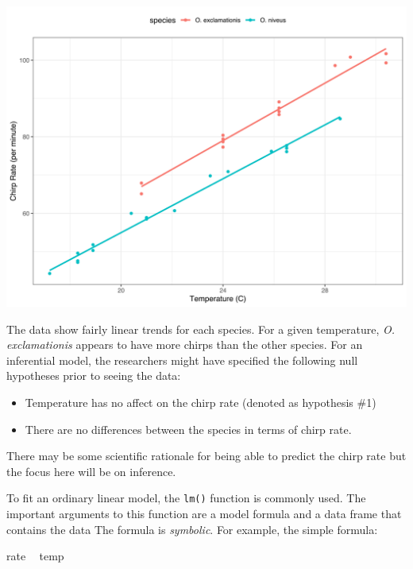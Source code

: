 \documentclass[11pt]{book}
\newenvironment{Shaded}{\begin{snugshade}}{\end{snugshade}}
\newcommand{\NormalTok}[1]{#1}
\newcommand{\OperatorTok}[1]{\textcolor[rgb]{0.81,0.36,0.00}{\textbf{#1}}}
\newcommand{\StringTok}[1]{\textcolor[rgb]{0.31,0.60,0.02}{#1}}
\begin{document}
\begin{center}\includegraphics[width=1\linewidth]{figures/tidyverse-cricket-plot-1} \end{center}

The data show fairly linear trends for each species. For a given temperature, \emph{O. exclamationis} appears to have more chirps than the other species. For an inferential model, the researchers might have specified the following null hypotheses prior to seeing the data:

\begin{itemize}
\item
  Temperature has no affect on the chirp rate (denoted as hypothesis \#1)
\item
  There are no differences between the species in terms of chirp rate.
\end{itemize}

There may be some scientific rationale for being able to predict the chirp rate but the focus here will be on inference.

To fit an ordinary linear model, the \texttt{lm()} function is commonly used. The important arguments to this function are a model formula and a data frame that contains the data The formula is \emph{symbolic}. For example, the simple formula:

\begin{Shaded}
\begin{Highlighting}[]
\NormalTok{rate }\OperatorTok{~}\StringTok{ }\NormalTok{temp}
\end{Highlighting}
\end{Shaded}
\end{document}
